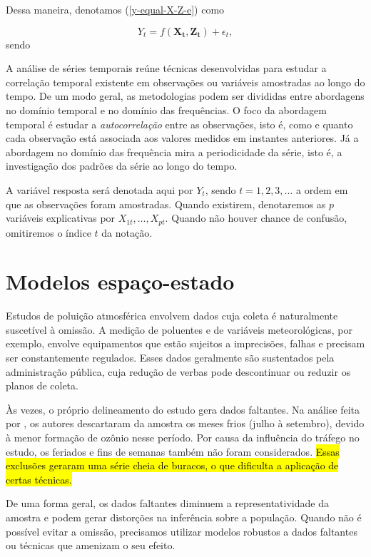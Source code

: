 
Dessa maneira, denotamos (\ref{y-equal-X-Z-e}) como

\begin{displaymath}
Y_t = f(\mathbf{X_t}, \mathbf{Z_t}) + \epsilon_t,
\end{displaymath}
sendo 

A análise de séries temporais reúne técnicas desenvolvidas para estudar a correlação temporal existente em observações ou variáveis amostradas ao longo do tempo. De um modo geral, as metodologias podem ser divididas entre abordagens no domínio temporal e no domínio das frequências. O foco da abordagem temporal é estudar a \textit{autocorrelação} entre as observações, isto é, como e quanto cada observação está associada aos valores medidos em instantes anteriores. Já a abordagem no domínio das frequência mira a periodicidade da série, isto é, a investigação dos padrões da série ao longo do tempo.

A variável resposta será denotada aqui por $Y_t$, sendo $t = 1, 2, 3, \dots$ a ordem em que as observações foram amostradas. Quando existirem, denotaremos as $p$ variáveis explicativas por $X_{1t}, \dots, X_{pt}$. Quando não houver chance de confusão, omitiremos o índice $t$ da notação.



\section{Modelos espaço-estado}

Estudos de poluição atmosférica envolvem dados cuja coleta é naturalmente suscetível à omissão. A medição de poluentes e de variáveis meteorológicas, por exemplo, envolve equipamentos que estão sujeitos a imprecisões, falhas e precisam ser constantemente regulados. Esses dados geralmente são sustentados pela administração pública, cuja redução de verbas pode descontinuar ou reduzir os planos de coleta.

Às vezes, o próprio delineamento do estudo gera dados faltantes. Na análise feita por \cite{Salvo2014}, os autores descartaram da amostra os meses frios (julho à setembro), devido à menor formação de ozônio nesse período. Por causa da influência do tráfego no estudo, os feriados e fins de semanas também não foram considerados. \hl{Essas exclusões geraram uma série cheia de buracos, o que dificulta a aplicação de certas técnicas.}

De uma forma geral, os dados faltantes diminuem a representatividade da amostra e podem gerar distorções na inferência sobre a população. Quando não é possível evitar a omissão, precisamos utilizar modelos robustos a dados faltantes ou técnicas que amenizam o seu efeito.

